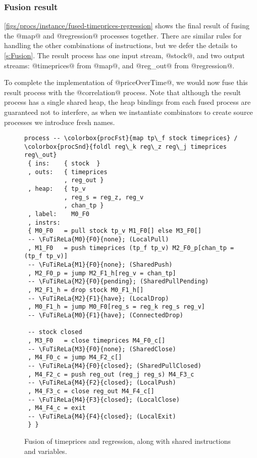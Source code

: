 \subsubsection{Fusion result}
\autoref{figs/procs/instance/fused-timeprices-regression} shows the final result of fusing the @map@ and @regression@ processes together.
There are similar rules for handling the other combinations of instructions, but we defer the details to \autoref{s:Fusion}.
The result process has one input stream, @stock@, and two output streams: @timeprices@ from @map@, and @reg_out@ from @regression@.

To complete the implementation of @priceOverTime@, we would now fuse this result process with the @correlation@ process.
Note that although the result process has a single shared heap, the heap bindings from each fused process are guaranteed not to interfere, as when we instantiate combinators to create source processes we introduce fresh names. 



\begin{figure}
\begin{lstlisting}[language=process,linebackgroundcolor={
  \hilineFst{2}
  \hilineFst{3}
  \hilineSnd{4}
  \hilineFst{5}
  \hilineSnd{6}
  \hilineCom{7}
  \hilineFst{10}
  \hilineFst{11}
  \hilineFst{12}
  \hilineFst{13}
  \hilineSnd{14}
  \hilineSnd{15}
  \hilineFst{16}
  \hilineFst{17}
  \hilineSnd{18}
  \hilineSnd{19}
  \hilineFst{22}
  \hilineFst{23}
  \hilineSnd{24}
  \hilineSnd{25}
  \hilineSnd{26}
  \hilineSnd{27}
  \hilineSnd{28}
  \hilineSnd{29}
  \hilineCom{30}
  \hilineCom{31}
  }]
process -- \colorbox{procFst}{map tp\_f stock timeprices} / \colorbox{procSnd}{foldl reg\_k reg\_z reg\_j timeprices reg\_out}
 { ins:    { stock  }
 , outs:   { timeprices
           , reg_out }
 , heap:   { tp_v
           , reg_s = reg_z, reg_v
           , chan_tp }
 , label:    M0_F0
 , instrs:
 { M0_F0   = pull stock tp_v M1_F0[] else M3_F0[]
 -- \FuTiReLa{M0}{F0}{none}; (LocalPull)
 , M1_F0   = push timeprices (tp_f tp_v) M2_F0_p[chan_tp = (tp_f tp_v)]
 -- \FuTiReLa{M1}{F0}{none}; (SharedPush)
 , M2_F0_p = jump M2_F1_h[reg_v = chan_tp]
 -- \FuTiReLa{M2}{F0}{pending}; (SharedPullPending)
 , M2_F1_h = drop stock M0_F1_h[] 
 -- \FuTiReLa{M2}{F1}{have}; (LocalDrop)
 , M0_F1_h = jump M0_F0[reg_s = reg_k reg_s reg_v]
 -- \FuTiReLa{M0}{F1}{have}; (ConnectedDrop)

 -- stock closed
 , M3_F0   = close timeprices M4_F0_c[] 
 -- \FuTiReLa{M3}{F0}{none}; (SharedClose)
 , M4_F0_c = jump M4_F2_c[] 
 -- \FuTiReLa{M4}{F0}{closed}; (SharedPullClosed)
 , M4_F2_c = push reg_out (reg_j reg_s) M4_F3_c 
 -- \FuTiReLa{M4}{F2}{closed}; (LocalPush)
 , M4_F3_c = close reg_out M4_F4_c[] 
 -- \FuTiReLa{M4}{F3}{closed}; (LocalClose)
 , M4_F4_c = exit
 -- \FuTiReLa{M4}{F4}{closed}; (LocalExit)
 } }
\end{lstlisting}
\caption{Fusion of \colorbox{procFst}{timeprices} and \colorbox{procSnd}{regression}, along with \colorbox{procCommon}{shared} instructions and variables. }
\label{figs/procs/instance/fused-timeprices-regression}
\end{figure}

